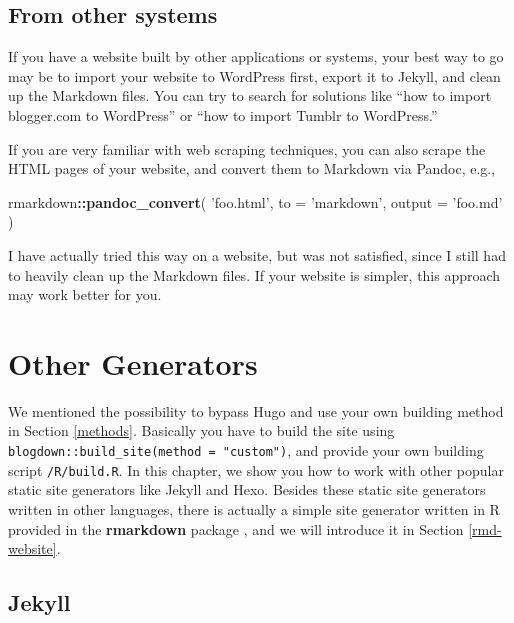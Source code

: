 \documentclass[12pt,]{krantz}
\makeatletter
\newenvironment{Shaded}{\begin{snugshade}}{\end{snugshade}}
\newcommand{\KeywordTok}[1]{\textcolor[rgb]{0.13,0.29,0.53}{\textbf{#1}}}
\newcommand{\DataTypeTok}[1]{\textcolor[rgb]{0.13,0.29,0.53}{#1}}
\newcommand{\StringTok}[1]{\textcolor[rgb]{0.31,0.60,0.02}{#1}}
\newcommand{\OperatorTok}[1]{\textcolor[rgb]{0.81,0.36,0.00}{\textbf{#1}}}
\newcommand{\NormalTok}[1]{#1}
\newenvironment{kframe}{%
\medskip{}
\setlength{\fboxsep}{.8em}
 \def\at@end@of@kframe{}%
 \ifinner\ifhmode%
  \def\at@end@of@kframe{\end{minipage}}%
  \begin{minipage}{\columnwidth}%
 \fi\fi%
 \def\FrameCommand##1{\hskip\@totalleftmargin \hskip-\fboxsep
 \colorbox{shadecolor}{##1}\hskip-\fboxsep
     \hskip-\linewidth \hskip-\@totalleftmargin \hskip\columnwidth}%
 \MakeFramed {\advance\hsize-\width
   \@totalleftmargin\z@ \linewidth\hsize
   \@setminipage}}%
 {\par\unskip\endMakeFramed%
 \at@end@of@kframe}
\renewenvironment{Shaded}{\begin{kframe}}{\end{kframe}}
\theoremstyle{definition}
\theoremstyle{definition}
\theoremstyle{definition}
\theoremstyle{remark}
\makeatother
\begin{document}
\section{From other systems}\label{from-other-systems}

If you have a website built by other applications or systems, your best
way to go may be to import your website to WordPress first, export it to
Jekyll, and clean up the Markdown files. You can try to search for
solutions like ``how to import blogger.com to WordPress'' or ``how to
import Tumblr to WordPress.''

If you are very familiar with web scraping techniques, you can also
scrape the HTML pages of your website, and convert them to Markdown via
Pandoc, e.g.,

\begin{Shaded}
\begin{Highlighting}[]
\NormalTok{rmarkdown}\OperatorTok{::}\KeywordTok{pandoc_convert}\NormalTok{(}
  \StringTok{'foo.html'}\NormalTok{, }\DataTypeTok{to =} \StringTok{'markdown'}\NormalTok{, }\DataTypeTok{output =} \StringTok{'foo.md'}
\NormalTok{)}
\end{Highlighting}
\end{Shaded}

I have actually tried this way on a website, but was not satisfied,
since I still had to heavily clean up the Markdown files. If your
website is simpler, this approach may work better for you.

\chapter{Other Generators}\label{other-generators}

We mentioned the possibility to bypass Hugo and use your own building
method in Section \ref{methods}. Basically you have to build the site
using \texttt{blogdown::build\_site(method\ =\ "custom")}, and provide
your own building script \texttt{/R/build.R}. In this chapter, we show
you how to work with other popular static site generators like Jekyll
and Hexo. Besides these static site generators written in other
languages, there is actually a simple site generator written in R
provided in the \textbf{rmarkdown} package \citep{R-rmarkdown}, and we
will introduce it in Section \ref{rmd-website}.

\section{Jekyll}\label{jekyll}
\end{document}
